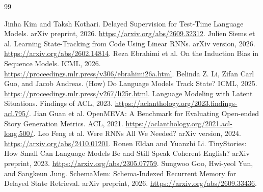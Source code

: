 \begin{thebibliography}{99}
\raggedright
{} Jinha Kim and Taksh Kothari. Delayed Supervision for Test-Time Language Models. arXiv preprint, 2026.
\url{https://arxiv.org/abs/2609.32312}.
 Julien Siems et al. Learning State-Tracking from Code Using Linear RNNs. arXiv version, 2026.
\url{https://arxiv.org/abs/2602.14814}.
 Reza Ebrahimi et al. On the Induction Bias in Sequence Models. ICML, 2026.
\url{https://proceedings.mlr.press/v306/ebrahimi26a.html}.
 Belinda Z. Li, Zifan Carl Guo, and Jacob Andreas. (How) Do Language Models Track State? ICML, 2025.
\url{https://proceedings.mlr.press/v267/li25r.html}.
 Language Modeling with Latent Situations. Findings of ACL, 2023.
\url{https://aclanthology.org/2023.findings-acl.795/}.
 Jian Guan et al. OpenMEVA: A Benchmark for Evaluating Open-ended Story Generation Metrics. ACL, 2021.
\url{https://aclanthology.org/2021.acl-long.500/}.
 Leo Feng et al. Were RNNs All We Needed? arXiv version, 2024.
\url{https://arxiv.org/abs/2410.01201}.
 Ronen Eldan and Yuanzhi Li. TinyStories: How Small Can Language Models Be and Still Speak Coherent English? arXiv preprint, 2023.
\url{https://arxiv.org/abs/2305.07759}.
 Sungwoo Goo, Hwi-yeol Yun, and Sangkeun Jung.
SchemaMem: Schema-Indexed Recurrent Memory for Delayed State Retrieval.
arXiv preprint, 2026. \url{https://arxiv.org/abs/2609.33436}.
\end{thebibliography}

